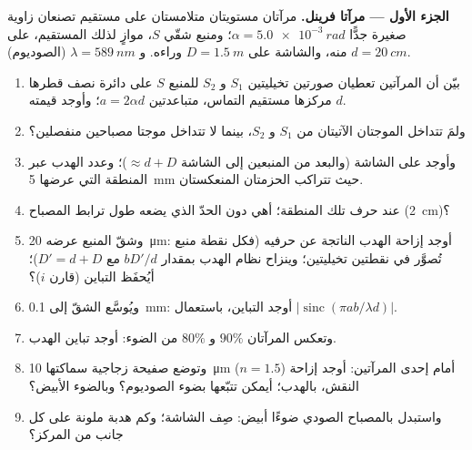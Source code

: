 \begin{problem}
\label{pb:b2:two-wave-interference:1}

\medskip
\noindent\textbf{الجزء الأول --- مرآتا فرينل.}
مرآتان مستويتان متلامستان على مستقيم تصنعان زاوية صغيرة جدًّا $\alpha =
\qty{5.0e-3}{rad}$؛ ومنبع شقّي $S$، موازٍ لذلك المستقيم، على $d =
\qty{20}{cm}$ منه، والشاشة على $D = \qty{1.5}{m}$ وراءه. و $\lambda =
\qty{589}{nm}$ (الصوديوم).
\begin{enumerate}
  \item بيّن أن المرآتين تعطيان صورتين تخيليتين $S_1$ و $S_2$ للمنبع
        $S$ على دائرة نصف قطرها $d$ مركزها مستقيم التماس،
        متباعدتين $a = 2\alpha d$؛ وأوجد قيمته.
  \item ولمَ تتداخل الموجتان الآتيتان من $S_1$ و $S_2$، بينما لا تتداخل
        موجتا مصباحين منفصلين؟
  \item وأوجد  على الشاشة (والبعد من المنبعين إلى
        الشاشة $\approx d + D$)؛ وعدد الهدب عبر
        المنطقة التي عرضها \qty{5}{mm} حيث تتراكب الحزمتان المنعكستان.
  \item {} عند حرف تلك المنطقة؛ أهي دون
        الحدّ الذي يضعه طول ترابط المصباح (\qty{2}{cm})؟
  \item وشقّ المنبع عرضه \qty{20}{\micro m}: أوجد إزاحة الهدب
        الناتجة عن حرفيه (فكل نقطة منبع تُصوَّر في نقطتين
        تخيليتين؛ وينزاح نظام الهدب بمقدار $bD'/d$ مع $D' =
        d + D$)؛ أيُحفَظ التباين (قارن  $i$)؟
  \item ويُوسَّع الشقّ إلى \qty{0.1}{mm}: أوجد التباين، باستعمال
        $|\operatorname{sinc}(\pi ab/\lambda d)|$.
  \item وتعكس المرآتان $90\%$ و $80\%$ من الضوء: أوجد تباين
        الهدب.
  \item وتوضع صفيحة زجاجية سماكتها \qty{10}{\micro m} ($n = 1.5$)
        أمام إحدى المرآتين: أوجد إزاحة النقش، بالهدب؛ أيمكن
        تتبّعها بضوء الصوديوم؟ وبالضوء الأبيض؟
  \item واستبدل بالمصباح الصودي ضوءًا أبيض: صِف الشاشة؛
        وكم هدبة ملونة على كل جانب من المركز؟
\end{enumerate}


\end{problem}
